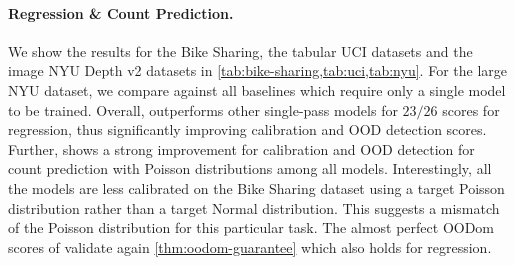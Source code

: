 \paragraph{Regression \& Count Prediction.} We show the results for the Bike Sharing, the tabular UCI datasets and the image NYU Depth v2 datasets in \cref{tab:bike-sharing,tab:uci,tab:nyu}. For the large NYU dataset, we compare against all baselines which require only a single model to be trained. Overall, \NatPNacro{} outperforms other single-pass models for $23/26$ scores for regression, thus significantly improving calibration and OOD detection scores. Further, \NatPNacro{} shows a strong improvement for calibration and OOD detection for count prediction with Poisson distributions among all models. Interestingly, all the models are less calibrated on the Bike Sharing dataset using a target Poisson distribution rather than a target Normal distribution. This suggests a mismatch of the Poisson distribution for this particular task. The almost perfect OODom scores of \NatPNacro{} validate again \cref{thm:oodom-guarantee} which also holds for regression.

\begin{table}
\vspace{-0mm}
	\centering
    \caption{Batched Inference Time (in ms), NVIDIA GTX 1080 Ti}
\label{tab:inference-time}
\vspace{-0mm}
\vspace{-0mm}
\end{table}

